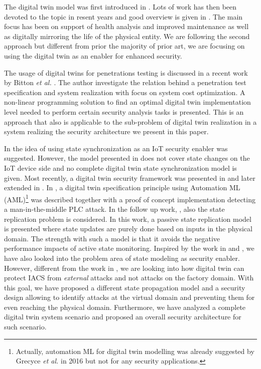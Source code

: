 The digital twin model was first introduced in \cite{Shafto2010}. Lots of work has then been devoted to the topic in resent years and good overview is given in \cite{Negri2017}. The main focus has been on support of health analysis and improved maintenance as well as digitally mirroring the life of the physical entity. We are following the second approach but different from prior the majority of prior art, we are focusing on using the digital twin as an enabler for enhanced security.  

The usage of digital twins for penetrations testing is discussed in a recent work by Bitton \emph{et al.} \cite{Bittion2018}. The author investigate the relation behind a penetration test specification and system realization with focus on system cost optimization. A non-linear programming solution to find an optimal digital twin implementation level needed to perform  certain security analysis tasks is presented. This is an approach that also is applicable to the sub-problem of digital twin realization in a system realizing the security architecture we present in this paper. 

In \cite{Gehrmann2016} the idea of using state synchronization as an IoT security enabler was suggested. However, the model presented in \cite{Gehrmann2016} does not cover state changes on the IoT device side and no complete digital twin state synchronization model is given. Most recently, a digital twin security framework was presented in \cite{Eckhart2018_2} and later extended in \cite{Eckhart2018}. In \cite{Eckhart2018_2}, a digital twin specification principle using Automation ML (AML)\footnote{Actually, automation ML for digital twin modelling was already suggested by Grecyce  \emph{et al.} in 2016 \cite{Greyce2016} but not for any security applications.} was described together with a proof of concept implementation detecting a man-in-the-middle PLC attack. In the follow up work, \cite{Eckhart2018}, also the state replication problem is considered. In this work, a passive state replication model is presented where state updates are purely done based on inputs in the physical domain. The strength with such a model is that it avoids the negative performance impacts of active state monitoring. Inspired by the work in \cite{Eckhart2018_2} and \cite{Eckhart2018}, we have also looked into the problem area of state modeling as security enabler. However, different from the work in \cite{Eckhart2018}, we are looking into how digital twin can protect IACS from {\it external} attacks and not attacks on the factory domain. With this goal, we have proposed a different state propagation model and a security design allowing to  identify attacks at the virtual domain and preventing them for even reaching the physical domain. Furthermore, we have analyzed a complete digital twin system scenario and proposed an overall security architecture for such scenario.

